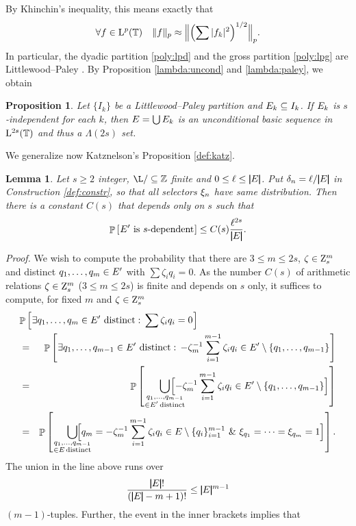 \documentclass[a4paper]{article}
\newtheorem{lem}[thm]{Lemma}
\newtheorem{prp}[thm]{Proposition}
\def\dem{{\it Proof.\/ }}
\def\barre{\rule[-2.5pt]{0.8pt}{10pt}}
\def\lmes{\kern0.7pt\barre\kern0.7pt}
\def\rmes{\kern0.7pt\/\barre\kern0.7pt}
\def\mes#1{\mbox{$\lmes #1 \rmes$}}
\def\P#1{\mathop{\mathbb P}\nolimits
\left[\kern0.5pt{#1}\kern0.5pt\right]}
\def\Zeta{{\fam0 Z}}
\def\Z{\hbox{${\mathbb Z}$}}
\def\T{\hbox{${\mathbb T}$}}
\def\lst#1#2{#1_1,\dots,#1_{#2}}
\def\SL#1#2{{\fam0 L}^{#1}_{#2}(\T)}
\def\SLP#1{\SL{p}{#1}}
\def\EL#1{$\Lambda(#1)$}
\def\DL/{\mbox{$\L/\subseteq\Z$}}
\begin{document}
%
By Khinchin's inequality, this means exactly that 
$$
\forall f\in\SLP{}\quad
\|f\|_p\approx\Bigl\|\Bigl(\sum|f_k|^2\Bigr)^{1/2}\Bigr\|_p.
$$
In particular, the dyadic partition \eqref{poly:lpd} and the
gross partition \eqref{poly:lpg} are Littlewood--Paley
\cite{lp31}. By Proposition \ref{lambda:uncond} and
\eqref{lambda:paley}, we obtain 
%
\begin{prp}\label{lambda:union}
%
Let $\{I_k\}$ be a Littlewood--Paley partition and $E_k\subseteq
I_k$. If $E_k$ is $s$-independent for each $k$, then
$E=\bigcup E_k$ is an unconditional basic sequence in $\SL{2s}{}$ and
thus a \EL{2s} set.
%
\end{prp}
%
We generalize now Katznelson's Proposition \ref{def:katz}.
%
%
\begin{lem}\label{lambda:estim}
%
Let $s\ge2$ integer, \DL/ finite and $0\le\ell\le\mes{\set}$. Put
$\delta_n=\ell/\mes{E}$ in
Construction \ref{def:constr}, so that all selectors $\xi_n$
have same distribution. Then there is a constant $C(s)$ that depends
only on $s$ such that
$$
\P{\set'\mbox{ is $s$-dependent\/}} \le 
C(s)\frac{\ell^{2s}}{\lmes \set\rmes }.
$$
%
\end{lem}
%
\dem
We wish to compute the probability that there are $3\le m\le 2s$,
$\zeta\in\Zeta_s^m$ and distinct $\lst qm\in\set'$ with
$\sum\zeta_iq_i=0$. As the number $C(s)$ of arithmetic relations 
$\zeta\in\Zeta_s^m$ ($3\le m\le 2s$) is finite and depends on $s$
only, it suffices to compute, for fixed $m$ and $\zeta\in\Zeta_s^m$
%
\begin{eqnarray*}
%
\lefteqn{\P{\exists\lst qm\in\set'\mbox{ distinct}:\,
\sum\zeta_iq_i=0}}\\
&=&\P{\exists\lst q{m-1}\in\set'\mbox{ distinct}:\,
-\zeta_m^{-1}\sum_{i=1}^{m-1}\zeta_iq_i\in
\set'\setminus\{\lst q{m-1}\}}\\
&=&\P{\bigcup_
{\substack{\lst q{m-1}\\\in\set'\,\text{distinct}}}\hskip-1.5em
\Bigl[-\zeta_m^{-1}\sum_{i=1}^{m-1}\zeta_iq_i\in
\set'\setminus\{\lst q{m-1}\}\Bigr]}\\
&=&\P{\bigcup_
{\substack{\lst q{m-1}\\
\in\set\,\text{distinct}}}\hskip-1.5em
\Bigl[q_m=-\zeta_m^{-1}\sum_{i=1}^{m-1}\zeta_iq_i\in
\set\setminus\{q_i\}_{i=1}^{m-1}\ \&\ 
\xi_{q_1}=\dots=\xi_{q_m}=1\Bigr]}.
%
\end{eqnarray*}
%
The union in the line above runs over 
$$
\frac{\lmes \set\rmes !}{(\lmes \set\rmes -m+1)!}\le\lmes \set\rmes ^{m-1}
$$
$(m-1)$-tuples. Further, the event in the inner brackets implies that
\end{document}
